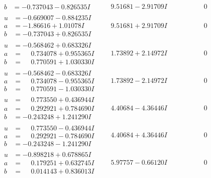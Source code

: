 \documentclass[1p]{elsarticle_modified}
\theoremstyle{definition}
\begin{document}
$$\begin{array}{c|c|c}
\begin{aligned}
b &= -0.737043 - 0.826535 I\end{aligned}
 & \phantom{-}9.51681 - 2.91709 I & \phantom{-0.000000 } 0 \\ \hline\begin{aligned}
u &= -0.669007 - 0.884235 I \\
a &= -1.86616 + 1.01078 I \\
b &= -0.737043 + 0.826535 I\end{aligned}
 & \phantom{-}9.51681 + 2.91709 I & \phantom{-0.000000 } 0 \\ \hline\begin{aligned}
u &= -0.568462 + 0.683326 I \\
a &= \phantom{-}0.734078 + 0.955365 I \\
b &= \phantom{-}0.770591 + 1.030330 I\end{aligned}
 & \phantom{-}1.73892 + 2.14972 I & \phantom{-0.000000 } 0 \\ \hline\begin{aligned}
u &= -0.568462 - 0.683326 I \\
a &= \phantom{-}0.734078 - 0.955365 I \\
b &= \phantom{-}0.770591 - 1.030330 I\end{aligned}
 & \phantom{-}1.73892 - 2.14972 I & \phantom{-0.000000 } 0 \\ \hline\begin{aligned}
u &= \phantom{-}0.773550 + 0.436944 I \\
a &= \phantom{-}0.292921 + 0.784690 I \\
b &= -0.243248 + 1.241290 I\end{aligned}
 & \phantom{-}4.40684 - 4.36446 I & \phantom{-0.000000 } 0 \\ \hline\begin{aligned}
u &= \phantom{-}0.773550 - 0.436944 I \\
a &= \phantom{-}0.292921 - 0.784690 I \\
b &= -0.243248 - 1.241290 I\end{aligned}
 & \phantom{-}4.40684 + 4.36446 I & \phantom{-0.000000 } 0 \\ \hline\begin{aligned}
u &= -0.898218 + 0.678865 I \\
a &= \phantom{-}0.179251 + 0.632745 I \\
b &= \phantom{-}0.014143 + 0.836013 I\end{aligned}
 & \phantom{-}5.97757 - 0.66120 I & \phantom{-0.000000 } 0 \\ \hline\begin{aligned}

\end{aligned}
\end{array}$$
\end{document}
